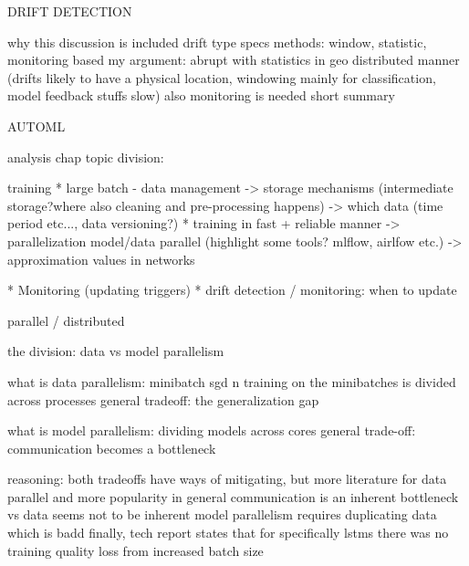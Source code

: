 DRIFT DETECTION

why this discussion is included
drift type specs
methods: window, statistic, monitoring based
my argument: abrupt with statistics in geo distributed manner (drifts likely to have a physical location, windowing mainly for classification, model feedback stuffs slow)
also monitoring is needed
short summary

AUTOML




analysis chap topic division: 

training
* large batch - data management
    -> storage mechanisms (intermediate storage?where also cleaning and pre-processing happens)
    -> which data (time period etc..., data versioning?)
* training in fast + reliable manner
	-> parallelization model/data parallel (highlight some tools? mlflow, airlfow etc.)
	-> approximation values in networks

* Monitoring (updating triggers)
* drift detection / monitoring: when to update


parallel / distributed

the division: data vs model parallelism

what is data parallelism: minibatch sgd n training on the minibatches is divided across processes
general tradeoff: the generalization gap

what is model parallelism: dividing models across cores
general trade-off: communication becomes a bottleneck

reasoning:
both tradeoffs have ways of mitigating, but more literature for data parallel and more popularity in general
communication is an inherent bottleneck vs data seems not to be inherent
model parallelism requires duplicating data which is badd
finally, tech report states that for specifically lstms there was no training quality loss from increased batch size